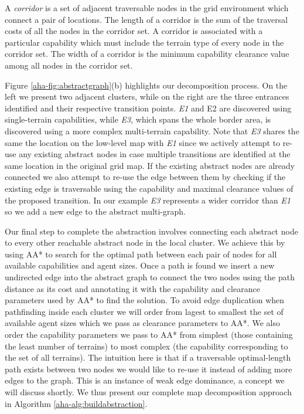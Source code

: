 \begin{definition}
A \emph{corridor} is a set of adjacent traversable nodes in the grid environment which connect a pair of locations. The length of a corridor is the sum of the traversal costs of all the nodes in the corridor set. A corridor is associated with a particular capability which must include the terrain type of every node in the corridor set. 
The width of a corridor is the minimum capability clearance value among all nodes in the corridor set. 
\end{definition}

Figure \ref{aha-fig:abstractgraph}(b) highlights our decomposition process. On the left we present two adjacent clusters, while on the right are the three entrances identified and their respective transition points. \emph{E1} and {E2} are discovered using single-terrain capabilities, while \emph{E3}, which spans the whole border area, is discovered using a more complex multi-terrain capability. 
Note that \emph{E3} shares the same the location on the low-level map with \emph{E1} since we actively attempt to re-use any existing abstract nodes in case multiple transitions are identified at the same location in the original grid map. If the existing abstract nodes are already connected we also attempt to re-use the edge between them by checking if the existing edge is traversable using the capability and maximal clearance values of the proposed transition. In our example \emph{E3} represents a wider corridor than \emph{E1} so we add a new edge to the abstract multi-graph. \\ \newline

Our final step to complete the abstraction involves connecting each abstract node to every other reachable abstract node in the local cluster. 
We achieve this by using AA* to search for the optimal path between each pair of nodes for all available capabilities and agent sizes. 
Once a path is found we insert a new undirected edge into the abstract graph to connect the two nodes using the path distance as its cost and annotating it with the capability and clearance parameters used by AA* to find the solution. 
To avoid edge duplication when pathfinding inside each  cluster we will order from lagest to smallest the set of available agent sizes which we pass as clearance parameters to AA*. 
We also order the capability parameters we pass to AA* from simplest (those containing the least number of terrains) to most complex (the capability corresponding to the set of all terrains). 
The intuition here is that if a traversable optimal-length path exists between two nodes we would like to re-use it instead of adding more edges to the graph. This is an instance of weak edge dominance, a concept we will discuss shortly.
We thus present our complete map decomposition approach in  Algorithm \ref{aha-alg:buildabstraction}.

